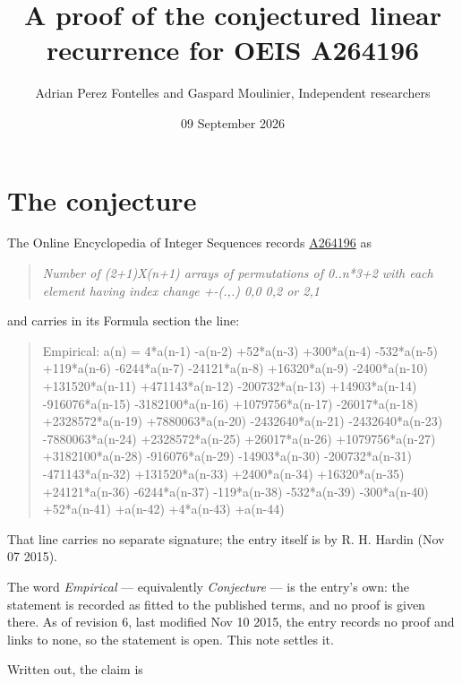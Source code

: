 \documentclass[11pt]{article}
\title{A proof of the conjectured linear recurrence for OEIS A264196}
\author{Adrian Perez Fontelles and Gaspard Moulinier, Independent researchers}
\date{09 September 2026}
\theoremstyle{definition}
\begin{document}
\maketitle
\section{The conjecture}

The Online Encyclopedia of Integer Sequences records \href{https://oeis.org/A264196}{A264196} as

\begin{quote}\itshape Number of (2+1)X(n+1) arrays of permutations of 0..n*3+2 with each element having index change +-(.,.) 0,0 0,2 or 2,1\end{quote}

and carries in its Formula section the line:

\begin{quote}\ttfamily Empirical: a(n) = 4*a(n-1) -a(n-2) +52*a(n-3) +300*a(n-4) -532*a(n-5) +119*a(n-6) -6244*a(n-7) -24121*a(n-8) +16320*a(n-9) -2400*a(n-10) +131520*a(n-11) +471143*a(n-12) -200732*a(n-13) +14903*a(n-14) -916076*a(n-15) -3182100*a(n-16) +1079756*a(n-17) -26017*a(n-18) +2328572*a(n-19) +7880063*a(n-20) -2432640*a(n-21) -2432640*a(n-23) -7880063*a(n-24) +2328572*a(n-25) +26017*a(n-26) +1079756*a(n-27) +3182100*a(n-28) -916076*a(n-29) -14903*a(n-30) -200732*a(n-31) -471143*a(n-32) +131520*a(n-33) +2400*a(n-34) +16320*a(n-35) +24121*a(n-36) -6244*a(n-37) -119*a(n-38) -532*a(n-39) -300*a(n-40) +52*a(n-41) +a(n-42) +4*a(n-43) +a(n-44)\end{quote}

That line carries no separate signature; the entry itself is by R. H. Hardin (Nov 07 2015).

The word {\itshape Empirical} --- equivalently {\itshape Conjecture} --- is the entry's own: the statement is recorded as fitted to the published terms, and no proof is given there. As of revision 6, last modified Nov 10 2015, the entry records no proof and links to none, so the statement is open. This note settles it.

Written out, the claim is
\end{document}

